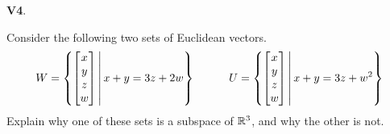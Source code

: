 \documentclass{article}
\newenvironment{problem}[1]
{
  \begin{flushleft}
  \textbf{#1}.
  \ignorespaces
}
{
  \end{flushleft}
}
\begin{document}
\begin{problem}{V4}
Consider the following two sets of Euclidean vectors.
\[
  W = \left\{\begin{bmatrix} x \\ y \\ z \\ w \end{bmatrix} \,\middle|\,x+y=3z+2w\right\}
\hspace{3em}
  U = \left\{\begin{bmatrix} x \\ y \\ z \\ w \end{bmatrix}\,\middle|\,x+y=3z+w^2\right\}
\]
Explain why one of these sets is a subspace of \(\mathbb{R}^3\), and
why the other is not.
\end{problem}
\end{document}
